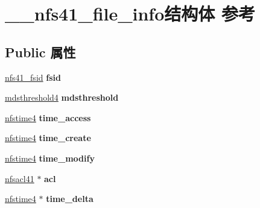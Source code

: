 \hypertarget{struct____nfs41__file__info}{}\section{\+\_\+\+\_\+nfs41\+\_\+file\+\_\+info结构体 参考}
\label{struct____nfs41__file__info}
\subsection*{Public 属性}
\begin{DoxyCompactItemize}
\item 
\mbox{\label{struct____nfs41__file__info_a2e9e9f32c354d29e321c3034c741c25a}} 
\hyperlink{struct____nfs41__fsid}{nfs41\+\_\+fsid} {\bfseries fsid}
\item 
\mbox{\label{struct____nfs41__file__info_a78e8b2788486f48140ada1ae5adf584a}} 
\hyperlink{struct____mdsthreshold4}{mdsthreshold4} {\bfseries mdsthreshold}
\item 
\mbox{\label{struct____nfs41__file__info_a830915620a221ac9d710cc2653389b87}} 
\hyperlink{struct____nfstime4}{nfstime4} {\bfseries time\+\_\+access}
\item 
\mbox{\label{struct____nfs41__file__info_a2e0515620efd3831043b79c07ddfcdda}} 
\hyperlink{struct____nfstime4}{nfstime4} {\bfseries time\+\_\+create}
\item 
\mbox{\label{struct____nfs41__file__info_a1ce04a39cf107a160ea88ea1adb73fac}} 
\hyperlink{struct____nfstime4}{nfstime4} {\bfseries time\+\_\+modify}
\item 
\mbox{\label{struct____nfs41__file__info_a0ece94079100c8fbe79fcd08d0caaa60}} 
\hyperlink{struct____nfsacl41}{nfsacl41} $\ast$ {\bfseries acl}
\item 
\mbox{\label{struct____nfs41__file__info_a8c8df5c6defb0d4b8d707515d1202572}} 
\hyperlink{struct____nfstime4}{nfstime4} $\ast$ {\bfseries time\+\_\+delta}
\item 
\mbox{\label{struct____nfs41__file__info_a31371fb92005929b8599cbdec90ed4a6}} 

\end{DoxyCompactItemize}
